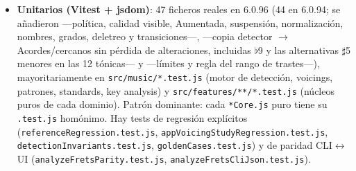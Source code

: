 \documentclass[a4paper,11pt,oneside]{report}
\newcommand{\flt}{\ensuremath{\flat}}
\newcommand{\shp}{\ensuremath{\sharp}}
\begin{document}
\begin{itemize}
\item \textbf{Unitarios (Vitest + jsdom)}: 47 ficheros reales en 6.0.96 (44 en 6.0.94; se añadieron \texttt{} ---política, calidad visible, Aumentada, suspensión, normalización, nombres, grados, deletreo y transiciones---, \texttt{} ---copia detector $\to$ Acordes/cercanos sin pérdida de alteraciones, incluidas \flt9 y las alternativas \shp5 menores en las 12 tónicas--- y \texttt{} ---límites y regla del rango de trastes---), mayoritariamente en \lstinline!src/music/*.test.js! (motor de detección, voicings, patrones, standards, key analysis) y \lstinline!src/features/**/*.test.js! (núcleos puros de cada dominio). Patrón dominante: cada \lstinline!*Core.js! puro tiene su \lstinline!.test.js! homónimo. Hay tests de regresión explícitos (\lstinline!referenceRegression.test.js!, \lstinline!appVoicingStudyRegression.test.js!, \lstinline!detectionInvariants.test.js!, \lstinline!goldenCases.test.js!) y de paridad CLI$\leftrightarrow$UI (\lstinline!analyzeFretsParity.test.js!, \lstinline!analyzeFretsCliJson.test.js!).

\end{itemize}
\end{document}
